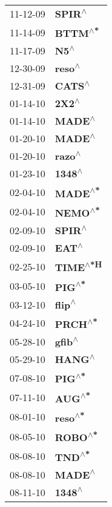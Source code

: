 \begin{supertabular}{p{0.08\textwidth}p{0.2\textwidth}}
 11-12-09 &    \textbf{SPIR\textsuperscript{$\wedge$}} \\
 11-14-09 &   \textbf{BTTM\textsuperscript{$\wedge$*}} \\
 11-17-09 &      \textbf{N5\textsuperscript{$\wedge$}} \\
 12-30-09 &    \textbf{reso\textsuperscript{$\wedge$}} \\
 12-31-09 &    \textbf{CATS\textsuperscript{$\wedge$}} \\
 01-14-10 &     \textbf{2X2\textsuperscript{$\wedge$}} \\
 01-14-10 &    \textbf{MADE\textsuperscript{$\wedge$}} \\
 01-20-10 &    \textbf{MADE\textsuperscript{$\wedge$}} \\
 01-20-10 &    \textbf{razo\textsuperscript{$\wedge$}} \\
 01-23-10 &    \textbf{1348\textsuperscript{$\wedge$}} \\
 02-04-10 &   \textbf{MADE\textsuperscript{$\wedge$*}} \\
 02-04-10 &   \textbf{NEMO\textsuperscript{$\wedge$*}} \\
 02-09-10 &    \textbf{SPIR\textsuperscript{$\wedge$}} \\
 02-09-10 &     \textbf{EAT\textsuperscript{$\wedge$}} \\
 02-25-10 &  \textbf{TIME\textsuperscript{$\wedge$*H}} \\
 03-05-10 &    \textbf{PIG\textsuperscript{$\wedge$*}} \\
 03-12-10 &    \textbf{flip\textsuperscript{$\wedge$}} \\
 04-24-10 &   \textbf{PRCH\textsuperscript{$\wedge$*}} \\
 05-28-10 &    \textbf{gfib\textsuperscript{$\wedge$}} \\
 05-29-10 &    \textbf{HANG\textsuperscript{$\wedge$}} \\
 07-08-10 &    \textbf{PIG\textsuperscript{$\wedge$*}} \\
 07-11-10 &    \textbf{AUG\textsuperscript{$\wedge$*}} \\
 08-01-10 &   \textbf{reso\textsuperscript{$\wedge$*}} \\
 08-05-10 &   \textbf{ROBO\textsuperscript{$\wedge$*}} \\
 08-08-10 &    \textbf{TND\textsuperscript{$\wedge$*}} \\
 08-08-10 &    \textbf{MADE\textsuperscript{$\wedge$}} \\
 08-11-10 &    \textbf{1348\textsuperscript{$\wedge$}} \\

\end{supertabular}
